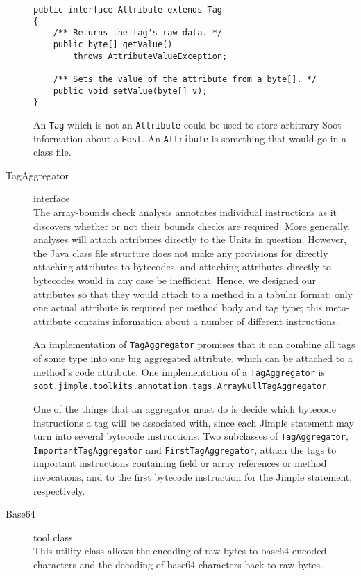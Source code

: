 \documentclass{article}
\begin{document}
\begin{description}
\begin{verbatim}
public interface Attribute extends Tag
{
    /** Returns the tag's raw data. */
    public byte[] getValue() 
        throws AttributeValueException;

    /** Sets the value of the attribute from a byte[]. */
    public void setValue(byte[] v);
}
\end{verbatim}

An {\tt Tag} which is not an {\tt Attribute} could be used
to store arbitrary Soot information about a {\tt Host}.  An {\tt Attribute}
is something that would go in a class file.

\item[TagAggregator] interface\\ The array-bounds check analysis
annotates individual instructions as it discovers whether or not their
bounds checks are required.  More generally, analyses will attach
attributes directly to the Units in question.  However, the Java
class file structure does not make any provisions for directly attaching
attributes to bytecodes, and attaching attributes directly to
bytecodes would in any case be inefficient.  Hence, we designed our
attributes so that they would attach to a method in a tabular
format: only one actual attribute is required per method body and tag
type; this meta-attribute contains information about a number of
different instructions.

An implementation of {\tt TagAggregator} promises that it can combine
all tags of some type into one big aggregated attribute, which can be
attached to a method's code attribute.  One implementation of a 
{\tt TagAggregator} is 
{\tt soot.jimple.toolkits.annotation.tags.ArrayNullTagAggregator}.

One of the things that an aggregator must do is decide which bytecode
instructions a tag will be associated with, since each Jimple statement
may turn into several bytecode instructions. Two subclasses of 
{\tt TagAggregator}, {\tt ImportantTagAggregator} and {\tt FirstTagAggregator},
attach the tags to important instructions containing field or array references
or method invocations, and to the first bytecode instruction for the Jimple
statement, respectively.

\item[Base64] tool class\\
This utility class allows the encoding of raw bytes to base64-encoded 
characters and the decoding of base64 characters back to raw bytes.
    

\end{description}
\end{document}
